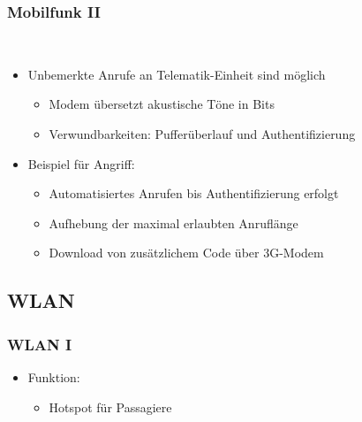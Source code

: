 \documentclass[t]{beamer}
\begin{document}
\begin{frame}
	\frametitle{Mobilfunk II}
    \ \par
    \begin{itemize}
		\item Unbemerkte Anrufe an Telematik-Einheit sind möglich
        \begin{itemize}
        	\item Modem übersetzt akustische Töne in Bits
            \item Verwundbarkeiten: Pufferüberlauf und Authentifizierung
        \end{itemize}
	\end{itemize}

    \begin{itemize}
        \item Beispiel für Angriff:
        \begin{itemize}
        	\item Automatisiertes Anrufen bis Authentifizierung erfolgt
            \item Aufhebung der maximal erlaubten Anruflänge
            \item Download von zusätzlichem Code über 3G-Modem
        \end{itemize}
    \end{itemize}
\end{frame}

\subsection{WLAN} %
 \begin{frame}
	\frametitle{WLAN I}
    \begin{itemize}
		\item Funktion:
        \begin{itemize}
			\item Hotspot für Passagiere
		\end{itemize}
    \end{itemize}
\end{frame}
\end{document}
